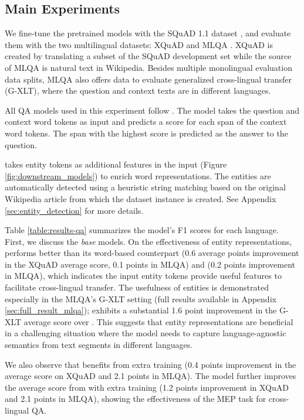 \documentclass[11pt]{article}
\newcommand{\minisection}[1]{\noindent{\bf {#1}.}}
\newcommand{\Appendix}[1]{Appendix \ref{#1}}
\newcommand{\Figure}[1]{Figure \ref{#1}}
\begin{document}
\subsection{Main Experiments}

\minisection{Datasets}
We fine-tune the pretrained models with the SQuAD 1.1 dataset \citep{rajpurkar-etal-2016-squad}, and evaluate them with the two multilingual datasets: XQuAD \citep{artetxe-etal-2020-cross} and MLQA \citep{lewis-etal-2020-mlqa}.
XQuAD is created by translating a subset of the SQuAD development set while the source of MLQA is natural text in Wikipedia.
Besides multiple monolingual evaluation data splits, MLQA also offers data to evaluate generalized cross-lingual transfer (G-XLT), where the question and context texts are in different languages.

\minisection{Models}
All QA models used in this experiment follow \citet{devlin2018bert}.
The model takes the question and context word tokens as input and predicts a score for each span of the context word tokens. The span with the highest score is predicted as the answer to the question.

\mlukeE{} takes entity tokens as additional features in the input (\Figure{fig:downstream_models}) to enrich word representations.
The entities are automatically detected using a heuristic string matching based on the original Wikipedia article from which the dataset instance is created.
See Appendix \ref{sec:entity_detection} for more details.

\minisection{Results}
Table \ref{table:results-qa} summarizes the model's F1 scores for each language.
First, we discuss the {\it base} models.
On the effectiveness of entity representations, \mlukeE{}\ba{} performs better than its word-based counterpart \mlukeW{}\ba{} (0.6 average points improvement in the XQuAD average score, 0.1 points in MLQA) and \xlmk{} (0.2 points improvement in MLQA), which indicates the input entity tokens provide useful features to facilitate cross-lingual transfer.
The usefulness of entities is demonstrated especially in the MLQA's G-XLT setting (full results available in \Appendix{sec:full_result_mlqa});
\mlukeE{}\ba{} exhibits a substantial 1.6 point improvement in the G-XLT average score over \mlukeW{}\ba{}.
This suggests that entity representations are beneficial in a challenging situation where the model needs to capture language-agnostic semantics from text segments in different languages.

We also observe that \xlmr{}\ba{} benefits from extra training (0.4 points improvement in the average score on XQuAD and 2.1 points in MLQA).
The \mlukeW{}\ba{} model further improves the average score from \xlmr{}\ba{} with extra training (1.2 points improvement in XQuAD and 2.1 points in MLQA), showing the effectiveness of the MEP task for cross-lingual QA.
\end{document}
